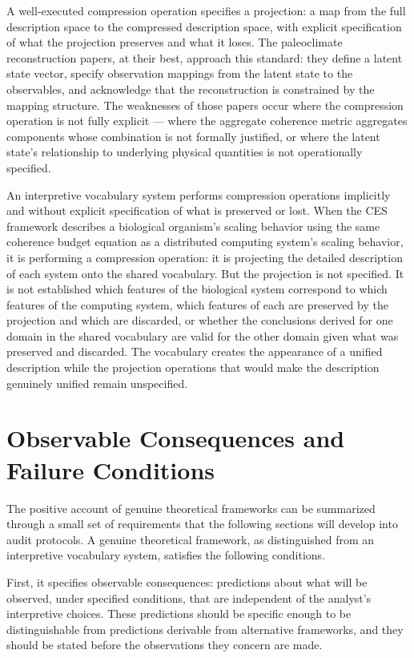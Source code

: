 \documentclass[12pt, openright, twoside]{book}
\begin{document}
A well-executed compression operation specifies a projection: a map from
the full description space to the compressed description space, with explicit
specification of what the projection preserves and what it loses. The
paleoclimate reconstruction papers, at their best, approach this standard:
they define a latent state vector, specify observation mappings from the
latent state to the observables, and acknowledge that the reconstruction
is constrained by the mapping structure. The weaknesses of those papers
occur where the compression operation is not fully explicit --- where
the aggregate coherence metric aggregates components whose combination
is not formally justified, or where the latent state's relationship to
underlying physical quantities is not operationally specified.

An interpretive vocabulary system performs compression operations implicitly
and without explicit specification of what is preserved or lost. When the
CES framework describes a biological organism's scaling behavior using the
same coherence budget equation as a distributed computing system's scaling
behavior, it is performing a compression operation: it is projecting the
detailed description of each system onto the shared vocabulary. But the
projection is not specified. It is not established which features of the
biological system correspond to which features of the computing system,
which features of each are preserved by the projection and which are
discarded, or whether the conclusions derived for one domain in the shared
vocabulary are valid for the other domain given what was preserved and
discarded. The vocabulary creates the appearance of a unified description
while the projection operations that would make the description genuinely
unified remain unspecified.

\section{Observable Consequences and Failure Conditions}

The positive account of genuine theoretical frameworks can be summarized
through a small set of requirements that the following sections will develop
into audit protocols. A genuine theoretical framework, as distinguished from
an interpretive vocabulary system, satisfies the following conditions.

First, it specifies observable consequences: predictions about what will
be observed, under specified conditions, that are independent of the
analyst's interpretive choices. These predictions should be specific enough
to be distinguishable from predictions derivable from alternative frameworks,
and they should be stated before the observations they concern are made.
\end{document}
